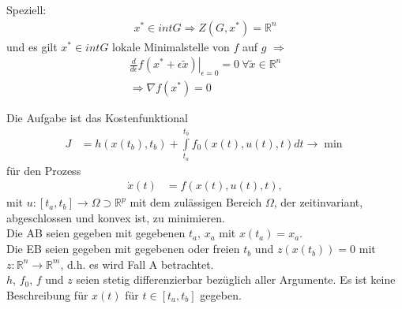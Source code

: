 Speziell: 
\begin{align*}
x^{\ast} \in int G \Rightarrow Z(G,x^{\ast}) = \mathbb{R}^n
\end{align*}
und es gilt $x^{\ast} \in int G$ lokale Minimalstelle von $f$ auf $g$ $\Rightarrow$
\begin{align*}
\left. \frac{d}{d\epsilon}f(x^{\ast} + \epsilon \tilde{x})\right|_{\epsilon=0} = 0 \: \forall \tilde{x} \in \mathbb{R}^n \\
\Rightarrow \nabla f(x^{\ast}) = 0
\end{align*}

Die Aufgabe ist das Kostenfunktional
\begin{align*}
	J & = h\left(x(t_b),t_b \right) + \int\limits_{t_a}^{t_b} f_0(x(t),u(t),t)dt\rightarrow\min
\end{align*}
für den Prozess
\begin{align*}
	\dot{x}(t) & = f\left( x(t),u(t),t \right),
\end{align*}
mit $u:[t_a,t_b]\rightarrow \Omega\supset\mathbb{R}^p$ mit dem zulässigen Bereich $\Omega$, der zeitinvariant, abgeschlossen und konvex ist, zu
minimieren.\\
Die \ac{AB} seien gegeben mit gegebenen $t_a$, $x_a$ mit $x(t_a)=x_a$.\\
Die \ac{EB} seien gegeben mit gegebenen oder freien $t_b$ und $z(x(t_b))=0$ mit $z:\mathbb{R}^n\rightarrow\mathbb{R}^m$, d.h. es wird Fall A
betrachtet.\\
$h$, $f_0$, $f$ und $z$ seien stetig differenzierbar bezüglich aller Argumente. Es ist keine Beschreibung für $x(t)$ für $t\in[t_a,t_b]$ gegeben.

